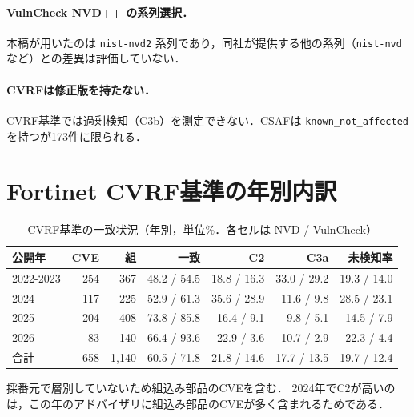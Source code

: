 \paragraph{VulnCheck NVD++ の系列選択．}
本稿が用いたのは \texttt{nist-nvd2} 系列であり，同社が提供する他の系列（\texttt{nist-nvd} など）との差異は評価していない．

\paragraph{CVRFは修正版を持たない．}
CVRF基準では過剰検知（C3b）を測定できない．CSAFは \texttt{known\_not\_affected} を持つが173件に限られる．

\section{Fortinet CVRF基準の年別内訳}
\label{app:cvrf-year}

\begin{table}[htbp]
  \caption{CVRF基準の一致状況（年別，単位\%．各セルは NVD / VulnCheck）}
  \label{tab:cvrf-year}
  \begin{center}
  \small
  \begin{tabular}{lrrrrrr}
    \hline
    公開年 & CVE & 組 & 一致 & C2 & C3a & 未検知率 \\
    \hline
    2022-2023 & 254 & 367 & 48.2 / 54.5 & 18.8 / 16.3 & 33.0 / 29.2 & 19.3 / 14.0 \\
    2024 & 117 & 225 & 52.9 / 61.3 & 35.6 / 28.9 & 11.6 / 9.8 & 28.5 / 23.1 \\
    2025 & 204 & 408 & 73.8 / 85.8 & 16.4 / 9.1 & 9.8 / 5.1 & 14.5 / 7.9 \\
    2026 & 83 & 140 & 66.4 / 93.6 & 22.9 / 3.6 & 10.7 / 2.9 & 22.3 / 4.4 \\
    \hline
    合計 & 658 & 1,140 & 60.5 / 71.8 & 21.8 / 14.6 & 17.7 / 13.5 & 19.7 / 12.4 \\
    \hline
  \end{tabular}
  \end{center}
  \footnotesize
  採番元で層別していないため組込み部品のCVEを含む．
  2024年でC2が高いのは，この年のアドバイザリに組込み部品のCVEが多く含まれるためである．
\end{table}
